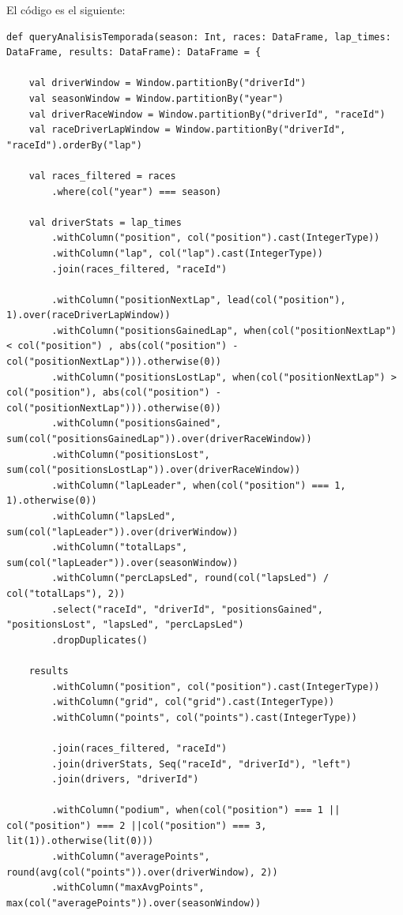 \documentclass[12pt,twoside,titlepage]{report}
\begin{document}
El código es el siguiente:

\begin{lstlisting}
def queryAnalisisTemporada(season: Int, races: DataFrame, lap_times: DataFrame, results: DataFrame): DataFrame = {
	
	val driverWindow = Window.partitionBy("driverId")
	val seasonWindow = Window.partitionBy("year")
	val driverRaceWindow = Window.partitionBy("driverId", "raceId")
	val raceDriverLapWindow = Window.partitionBy("driverId", "raceId").orderBy("lap")
	
	val races_filtered = races
		.where(col("year") === season)
	
	val driverStats = lap_times	
		.withColumn("position", col("position").cast(IntegerType)) 
		.withColumn("lap", col("lap").cast(IntegerType)) 
		.join(races_filtered, "raceId")
	
		.withColumn("positionNextLap", lead(col("position"), 1).over(raceDriverLapWindow))
		.withColumn("positionsGainedLap", when(col("positionNextLap") < col("position") , abs(col("position") - col("positionNextLap"))).otherwise(0))
		.withColumn("positionsLostLap", when(col("positionNextLap") > col("position"), abs(col("position") - col("positionNextLap"))).otherwise(0))
		.withColumn("positionsGained", sum(col("positionsGainedLap")).over(driverRaceWindow))
		.withColumn("positionsLost", sum(col("positionsLostLap")).over(driverRaceWindow))
		.withColumn("lapLeader", when(col("position") === 1, 1).otherwise(0))
		.withColumn("lapsLed", sum(col("lapLeader")).over(driverWindow))
		.withColumn("totalLaps", sum(col("lapLeader")).over(seasonWindow))
		.withColumn("percLapsLed", round(col("lapsLed") / col("totalLaps"), 2))
		.select("raceId", "driverId", "positionsGained", "positionsLost", "lapsLed", "percLapsLed")
		.dropDuplicates()
	
	results
		.withColumn("position", col("position").cast(IntegerType))    
		.withColumn("grid", col("grid").cast(IntegerType))    
		.withColumn("points", col("points").cast(IntegerType))
	
		.join(races_filtered, "raceId")
		.join(driverStats, Seq("raceId", "driverId"), "left")
		.join(drivers, "driverId")
	
		.withColumn("podium", when(col("position") === 1 || col("position") === 2 ||col("position") === 3, lit(1)).otherwise(lit(0)))
		.withColumn("averagePoints", round(avg(col("points")).over(driverWindow), 2))
		.withColumn("maxAvgPoints", max(col("averagePoints")).over(seasonWindow))
	

\end{lstlisting}
\end{document}
